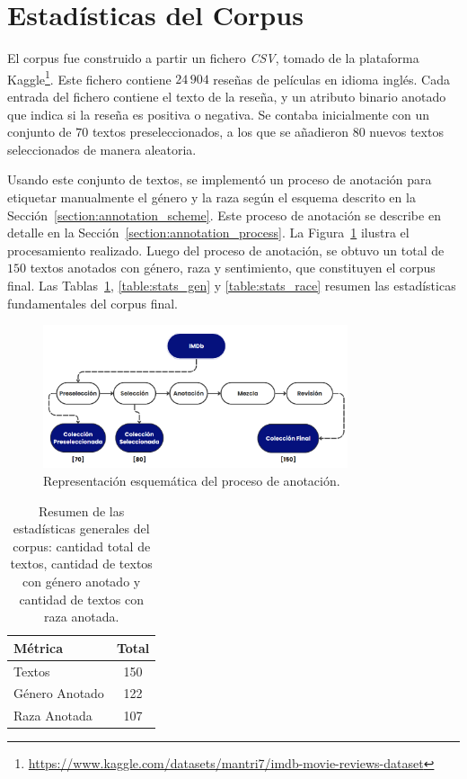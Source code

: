 \section{Estad\'isticas del Corpus}\label{section:corpus_stats}
El corpus fue construido a partir un fichero \emph{CSV}, tomado de la plataforma 
Kaggle\footnote{\url{https://www.kaggle.com/datasets/mantri7/imdb-movie-reviews-dataset}}. 
Este fichero contiene $24\,904$ rese\~nas de pel\'iculas en idioma ingl\'es. Cada entrada del fichero contiene el texto de la rese\~na, 
y un atributo binario anotado que indica si la rese\~na es positiva o negativa. Se contaba inicialmente con un conjunto de $70$ textos 
preseleccionados, a los que se a\~nadieron $80$ nuevos textos seleccionados de manera aleatoria.

Usando este conjunto de textos, se implement\'o un proceso de anotaci\'on para etiquetar manualmente el g\'enero y la raza seg\'un 
el esquema descrito en la Secci\'on~\ref{section:annotation_scheme}. Este proceso de anotaci\'on se describe en detalle en la 
Secci\'on~\ref{section:annotation_process}. La Figura~\ref{fig:ann_proc} ilustra el procesamiento realizado.
Luego del proceso de anotaci\'on, se obtuvo un total de $150$ textos anotados con g\'enero, raza y sentimiento, que constituyen el 
corpus final. Las Tablas~\ref{table:stats}, \ref{table:stats_gen} y \ref{table:stats_race}  resumen las estad\'isticas fundamentales 
del corpus final.

\begin{figure}[htpb]
    \begin{center}
        \includegraphics[width=0.8\textwidth]{Graphics/annotation_proc.png}
    \end{center}
    \caption{Representaci\'on esquem\'atica del proceso de anotaci\'on.}
    \label{fig:ann_proc}
\end{figure}

\begin{table}[htpb]
    \centering
        \begin{tabular}{lc}
        \toprule
        \textbf{M\'etrica} & \textbf{Total} \\
        \midrule
                    Textos & 150 \\
          G\'enero Anotado & 122 \\
              Raza Anotada & 107 \\

        \bottomrule
        \end{tabular}
    \caption{Resumen de las estad\'isticas generales del corpus: cantidad total de textos, cantidad de textos con g\'enero anotado y 
    cantidad de textos con raza anotada.}
    \label{table:stats}
\end{table}


